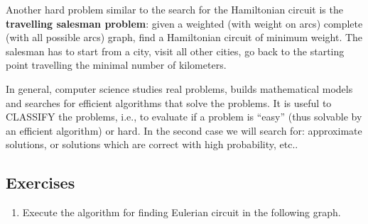 Another hard problem similar to the search for the Hamiltonian circuit is the \textbf{travelling salesman problem}: given a weighted (with weight on arcs) complete (with all possible arcs) graph, find a Hamiltonian circuit of minimum weight. The salesman has to start from a city, visit all other cities, go back to the starting point travelling the minimal number of kilometers.

In general, computer science studies real problems, builds mathematical models and searches for efficient algorithms that solve the problems. It is useful to CLASSIFY the problems, i.e., to evaluate if a problem is “easy” (thus solvable by an efficient algorithm) or hard. In the second case we will search for: approximate solutions, or solutions which are correct with high probability, etc..

\subsection{Exercises}
\begin{enumerate}
    \item Execute the algorithm for finding Eulerian circuit in the following graph.

    
\end{enumerate}